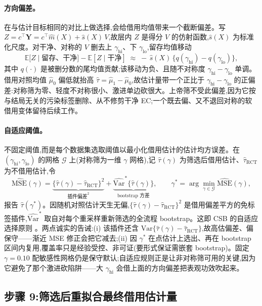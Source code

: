 \documentclass[11pt]{article}
\newcommand{\Exp}{\mathbb{E}}
\begin{document}
\paragraph{方向偏差。} 在与估计目标相同的对比上做选择,会给借用均值带来一个截断偏差。写 $Z=c^{\top}\bm Y=c^{\top}\widehat m(X)+\widehat s(X)\,V$,故层内 $Z$ 是得分 $V$ 的仿射函数,$\widehat s(X)$ 为标准化尺度。对干净、对称的 $V$ 删去上 $\gamma_{\mathrm{hi}}$、下 $\gamma_{\mathrm{lo}}$,留存均值移动
\[
\Exp\bigl[Z\mid\text{留存、干净}\bigr]-\Exp[Z\mid\text{干净}]
\;\approx\;-\,\widehat s(X)\,\bigl\{q(\gamma_{\mathrm{hi}})-q(\gamma_{\mathrm{lo}})\bigr\},
\]
其中 $q(\cdot)$ 是被删分数的尾均值贡献;该移动为负、且随不对称度 $\gamma_{\mathrm{hi}}-\gamma_{\mathrm{lo}}$ 单调。借用对照均值 $\widehat\mu_0$ 偏低就抬高 $\widehat\tau=\widehat\mu_1-\widehat\mu_0$,故估计量带一个正比于 $\gamma_{\mathrm{hi}}-\gamma_{\mathrm{lo}}$ 的正偏差:对称筛为零、轻度不对称很小、激进单边砍很大。上帝筛不受此偏差,因为它按与结局无关的污染标签删除、从不修剪干净 EC;一个既去偏、又不退回对称的软借用变体留待后续工作。

\paragraph{自适应阈值。} 不固定阈值,而是每个数据集选取阈值以最小化借用估计的估计均方误差。在 $(\gamma_{\mathrm{hi}},\gamma_{\mathrm{lo}})$ 的网格 $\mathcal G$ 上(对称筛为一维 $\gamma$ 网格),记 $\widehat\tau(\gamma)$ 为筛选后借用估计、$\widehat\tau_{\mathrm{RCT}}$ 为不借用估计,令
\[
\widehat{\mathrm{MSE}}(\gamma)
=
\underbrace{\bigl\{\widehat\tau(\gamma)-\widehat\tau_{\mathrm{RCT}}\bigr\}^2}_{\text{插件偏差}^2}
+
\underbrace{\widehat{\mathrm{Var}}^{\ast}\bigl\{\widehat\tau(\gamma)\bigr\}}_{\text{bootstrap 方差}},
\qquad
\gamma^{\ast}=\arg\min_{\gamma\in\mathcal G}\widehat{\mathrm{MSE}}(\gamma),
\]
报告 $\widehat\tau(\gamma^{\ast})$。因随机对照估计天生无偏,$\{\widehat\tau(\gamma)-\widehat\tau_{\mathrm{RCT}}\}^2$ 是借用偏差平方的免标签插件,$\widehat{\mathrm{Var}}^{\ast}$ 取自对每个重采样重新筛选的全流程 bootstrap。这即 CSB 的自适应选择原则 \citep{zhu2025csb}。两点诚实的告诫:(i) 该插件还含 $\mathrm{Var}\{\widehat\tau(\gamma)-\widehat\tau_{\mathrm{RCT}}\}$,故高估偏差、偏保守——渐近 MSE 修正会把它减去;(ii) 因 $\gamma^{\ast}$ 在点估计上选出、再在 bootstrap 区间内复用,覆盖率只是经验受控、非可证(要形式保证需嵌套 bootstrap)。固定 $\gamma=0.10$ 配敏感性网格仍是保守默认;自适应规则正是让非对称筛可用的关键,因为它避免了那个激进砍陷阱——大 $\gamma_{\mathrm{hi}}$ 会借上面的方向偏差把表观功效吹起来。

\subsection{步骤 9:筛选后重拟合最终借用估计量}\label{sec:refit}
\end{document}

